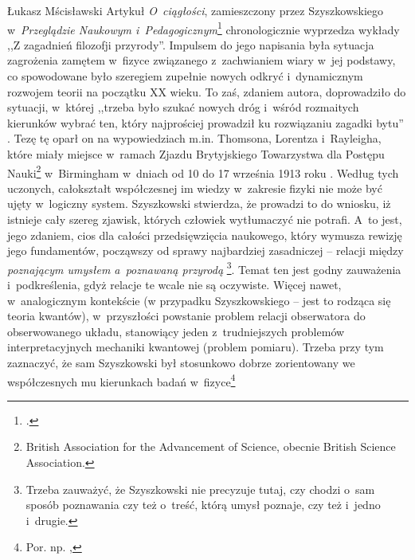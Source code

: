 \begin{artplenv}{Łukasz Mścisławski}
Artykuł \textit{O~ciągłości}, zamieszczony przez Szyszkowskiego w~\textit{Przeglądzie Naukowym i~Pedagogicznym}\footnote{
\parencite[][]{szyszkowski_o_1916}.%
} chronologicznie wyprzedza wykłady ,,Z zagadnień filozofji przyrody''. Impulsem do jego napisania była sytuacja zagrożenia zamętem w~fizyce związanego z~zachwianiem wiary w~jej podstawy, co spowodowane było szeregiem zupełnie nowych odkryć i~dynamicznym rozwojem teorii na początku XX wieku. To zaś, zdaniem autora, doprowadziło do sytuacji, w~której ,,trzeba było szukać nowych dróg i~wśród rozmaitych kierunków wybrać ten, który najprościej prowadził ku rozwiązaniu zagadki bytu'' 
\parencite[][s.~44]{szyszkowski_o_1916}. %
 Tezę tę oparł on na wypowiedziach m.in. Thomsona, Lorentza i~Rayleigha, które miały miejsce w~ramach Zjazdu Brytyjskiego Towarzystwa dla Postępu Nauki\footnote{British Association for the Advancement of Science, obecnie British Science Association.} w~Birmingham w~dniach od 10 do 17 września 1913 roku 
\parencite[por.][]{british_association_for_the_advancement_of_science_report_1914}. %
 Według tych uczonych, całokształt współczesnej im wiedzy w~zakresie fizyki nie może być ujęty w~logiczny system. Szyszkowski stwierdza, że prowadzi to do wniosku, iż istnieje cały szereg zjawisk, których człowiek wytłumaczyć nie potrafi. A~to jest, jego zdaniem, cios dla całości przedsięwzięcia naukowego, który wymusza rewizję jego fundamentów, począwszy od sprawy najbardziej zasadniczej -- relacji między \textit{poznającym umysłem a~poznawaną przyrodą} 
\parencite[][s.~44]{szyszkowski_o_1916}%
\footnote{Trzeba zauważyć, że Szyszkowski nie precyzuje tutaj, czy chodzi o~sam sposób poznawania czy też o~treść, którą umysł poznaje, czy też i~jedno i~drugie.}. Temat ten jest godny zauważenia i~podkreślenia, gdyż relacje te wcale nie są oczywiste. Więcej nawet, w~analogicznym kontekście (w przypadku Szyszkowskiego -- jest to rodząca się teoria kwantów), w~przyszłości powstanie problem relacji obserwatora do obserwowanego układu, stanowiący jeden z~trudniejszych problemów interpretacyjnych mechaniki kwantowej (problem pomiaru). Trzeba przy tym zaznaczyć, że sam Szyszkowski był stosunkowo dobrze zorientowany we współczesnych mu kierunkach badań w~fizyce\footnote{Por. np. 
\parencite[][]{szyszkowski_1911-1}, %
}
\end{artplenv}
